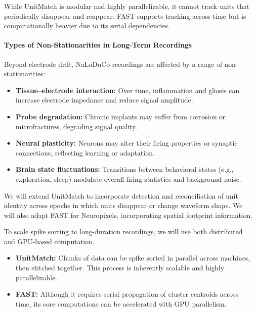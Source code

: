 While UnitMatch is modular and highly parallelizable, it cannot track units that periodically disappear and reappear. FAST supports tracking across time but is computationally heavier due to its serial dependencies.

\paragraph{Types of Non-Stationarities in Long-Term Recordings}
Beyond electrode drift, NaLoDuCo recordings are affected by a range of non-stationarities:

\begin{itemize}
    \item \textbf{Tissue–electrode interaction:} Over time, inflammation and gliosis can increase electrode impedance and reduce signal amplitude.
    \item \textbf{Probe degradation:} Chronic implants may suffer from corrosion or microfractures, degrading signal quality.
    \item \textbf{Neural plasticity:} Neurons may alter their firing properties or synaptic connections, reflecting learning or adaptation.
    \item \textbf{Brain state fluctuations:} Transitions between behavioral states (e.g., exploration, sleep) modulate overall firing statistics and background noise.
\end{itemize}

We will extend UnitMatch to incorporate detection and reconciliation of unit identity across epochs in which units disappear or change waveform shape. We will also adapt FAST for Neuropixels, incorporating spatial footprint information.

\label{sec:offlineMethodsScaling}

To scale spike sorting to long-duration recordings, we will use both distributed and GPU-based computation.

\begin{itemize}
    \item \textbf{UnitMatch:} Chunks of data can be spike sorted in parallel across machines, then stitched together. This process is inherently scalable and highly parallelizable.
    \item \textbf{FAST:} Although it requires serial propagation of cluster centroids across time, its core computations can be accelerated with GPU parallelism.
\end{itemize}

